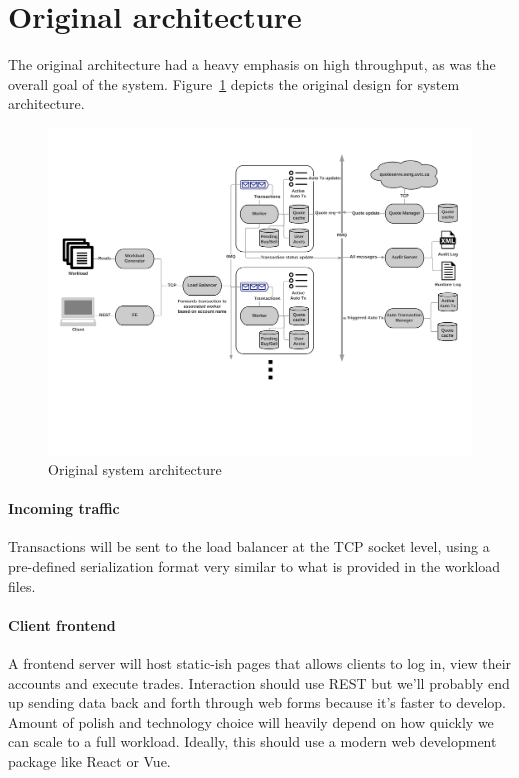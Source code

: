 \section{Original architecture}
The original architecture had a heavy emphasis on high throughput, as was the overall goal of the system. Figure~\ref{fig:arch-orig} depicts the original design for system architecture.

\begin{figure}[tbph]
  \centering
  \includegraphics[width=0.85\linewidth]{../architecture/graphics/arch}
  \caption{Original system architecture}
  \label{fig:arch-orig}
\end{figure}


\paragraph{Incoming traffic}
Transactions will be sent to the load balancer at the TCP socket level, using a pre-defined serialization format very similar to what is provided in the workload files.

\paragraph{Client frontend}
A frontend server will host static-ish pages that allows clients to log in, view their accounts and execute trades. Interaction should use REST but we'll probably end up sending data back and forth through web forms because it's faster to develop. Amount of polish and technology choice will heavily depend on how quickly we can scale to a full workload. Ideally, this should use a modern web development package like React or Vue.

